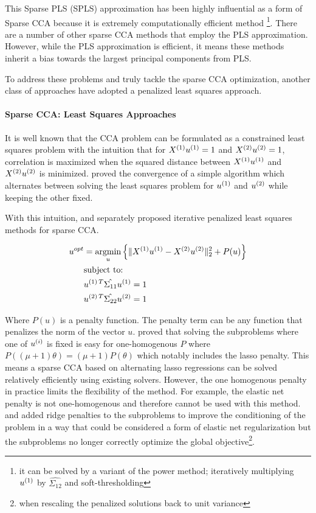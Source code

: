 This Sparse PLS (SPLS) approximation has been highly influential as a form of Sparse CCA because it is extremely computationally efficient method \footnote{it can be solved by a variant of the power method; iteratively multiplying $u^{(1)}$ by $\hat{\Sigma_{12}}$ and soft-thresholding}.
There are a number of other sparse CCA methods that employ the PLS approximation\citep{parkhomenko2009sparse, waaijenborg2008quantifying, lindenbaum2021l0}.
However, while the PLS approximation is efficient, it means these methods inherit a bias towards the largest principal components from PLS.

To address these problems and truly tackle the sparse CCA optimization, another class of approaches have adopted a penalized least squares approach.

\paragraph{Sparse CCA: Least Squares Approaches}

It is well known that the CCA problem can be formulated as a constrained least squares problem with the intuition that
for \(X^{(1)} u^{(1)}=1\) and \(X^{(2)} u^{(2)}=1\), correlation is maximized when the squared distance
between \(X^{(1)} u^{(1)}\) and \(X^{(2)} u^{(2)}\) is minimized. \citep{golub1995canonical} proved the
convergence of a simple algorithm which alternates between solving the least squares problem for \(u^{(1)}\) and
\(u^{(2)}\) while keeping the other fixed.

With this intuition, \cite{wilms2015sparse} and \cite{mai2019iterative} separately proposed iterative penalized least
squares methods for sparse CCA\@.

\begin{align}
    \label{eq:mai}
    u^{opt} &= \underset{u}{\mathrm{argmin}} \left\{ \|X^{(1)}u^{(1)} - X^{(2)}u^{(2)}\|_2^2 + P(u) \right\} \\
    &\text{subject to:} \notag \\
    &u^{(1)\,T} \hat{\Sigma_{11}} u^{(1)}=1 \notag \\
    &u^{(2)\,T} \hat{\Sigma_{22}} u^{(2)}=1 \notag
\end{align}

Where \(P(u)\) is a penalty function.
The penalty term can be any function that penalizes the norm of the vector \(u\).
\citep{mai2019iterative} proved that solving the subproblems where one of $u^{(i)}$ is fixed is easy for one-homogenous $P$ where
\( P((\mu + 1)\theta) = (\mu + 1)P(\theta) \) which notably includes the lasso penalty.
This means a sparse CCA based
on alternating lasso regressions can be solved relatively efficiently using existing solvers.
However, the one homogenous penalty in practice limits the flexibility of the method.
For example, the elastic net penalty is not one-homogenous and therefore cannot be used with this method.
\citet{6556581} and \cite{Mullins2021} added ridge penalties to the subproblems to improve the conditioning of the problem in a way that could be considered a form of elastic net regularization but the subproblems no longer correctly optimize the global objective\footnote{when rescaling the penalized solutions back to unit variance}.

